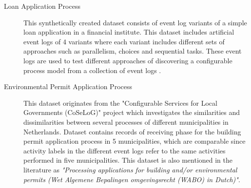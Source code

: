 \begin{description}
  \item[Loan Application Process \cite{loan-app-data}] This synthetically created dataset consists of event log variants of a simple loan application in a financial institute. This dataset includes artificial event logs of 4 variants where each variant includes different sets of approaches such as parallelism, choices and sequential tasks. These event logs are used to test different approaches of discovering a configurable process model from a collection of event logs \cite{buijs2014flexible}.
  \item[Environmental Permit Application Process \cite{coselog-data}] This dataset originates from the "Configurable Services for Local Governments (CoSeLoG)" project \cite{van2011business} which investigates the similarities and dissimilarities between several processes of different municipalities in Netherlands. Dataset contains records of receiving phase for the building permit application process in 5 municipalities, which are comparable since activity labels in the different event logs refer to the same activities performed in five municipalities. This dataset is also mentioned in the literature as \textit{"Processing applications for building and/or environmental permits (Wet Algemene Bepalingen omgevingsrecht (WABO) in Dutch)"}.
\end{description}